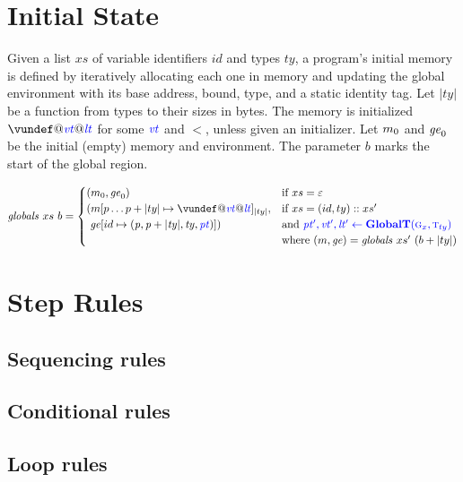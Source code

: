 \documentclass{llncs}
\begin{document}
\section{Initial State}

Given a list \(xs\) of variable identifiers \(id\) and types
\(ty\), a program's initial memory is defined by iteratively allocating each one
in memory and updating the global environment with its base address, bound, type,
and a static identity tag. Let \(|ty|\) be a function from types to their sizes
in bytes. The memory is initialized \(\vundef@\vt@\lt\)
for some \(\mathit{\color{blue} vt}\) and \(\lt\), unless given an initializer.
Let \(m_0\) and \(\mathit{ge}_0\) be the initial (empty) memory and environment.
The parameter \(b\) marks the start of the global region.


\[\mathit{globals} ~ xs ~ b =
\begin{cases}
  (\mem_0, \genv_0) & \textnormal{if } xs = \varepsilon \\
  (\mem[p \dots p+|ty| \mapsto \vundef@\vt@\lt]_{|ty|}, & \textnormal{if } xs = (id,ty)::xs' \\
  ~ \genv[id \mapsto (\mathit{p, p+|ty|,ty,\pt})]) & \textnormal{and } \trule{\globaltres}{\globalt} \\
  & \textnormal{where } (\mem,\genv) = \mathit{globals} ~ xs' ~ (b + |ty|) \\
\end{cases}\]

\section{Step Rules}
\label{app:rules}

\subsection{Sequencing rules}

\sequencing

\subsection{Conditional rules}

\conditionals

\subsection{Loop rules}
\end{document}
